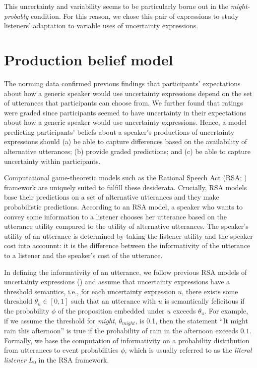 \documentclass[lucida,biblatex]{sp} %
\begin{document}
This uncertainty and variability seems to be particularly borne out in the \emph{might-probably} condition. For this reason, we chose this pair of expressions
to study listeners' adaptation to variable uses of uncertainty expressions.


\section{Production belief model}
\label{sec:model-baseline}

The norming data confirmed previous findings that participants' expectations 
about how a generic speaker would use uncertainty expressions 
depend on the set of utterances that participants can choose from.
We further found that ratings were graded since participants seemed to have uncertainty
in their expectations about how a generic speaker would use uncertainty expressions.
Hence, a model predicting participants' beliefs about a speaker's productions of uncertainty expressions
 should  (a) be able to capture differences based on the availability of alternative utterances; 
(b) provide graded predictions; 
and (c) be able to capture uncertainty within participants.

Computational game-theoretic models such as the Rational Speech Act (RSA; \cite{Goodman2016}) 
framework are uniquely suited to fulfill these desiderata.
Crucially, RSA models  base their predictions on a set of alternative utterances and 
they make probabilistic predictions.  According to an RSA model, a speaker who wants to
 convey some information to a listener 
chooses her utterance based on the utterance utility compared to the utility of alternative utterances. 
The speaker's utility of an utterance is determined by taking the listener utility and the speaker cost into accounnt: 
it is the difference between the informativity of the utterance to a listener and the speaker's cost of the utterance.

In defining the informativity of an utterance, we follow previous RSA models of uncertainty expressions (\cite{Lassiter2013,Herbstritt2019}) 
and assume that uncertainty expressions have a threshold semantics, 
i.e., for each uncertainty expression $u$, there exists some threshold $\theta_u \in [0,1]$ 
such that an utterance with $u$ is semantically felicitous if the probability $\phi$ 
of the proposition embedded under $u$ exceeds $\theta_u$. 
For example, if we assume the threshold for \textit{might}, $\theta_{might}$, is 0.1, then the statement 
``It might rain this afternoon'' is true if the probability of rain in the afternoon exceeds $0.1$. 
Formally, we base the computation of informativity on a probability distribution from utterances to event probabilities $\phi$, 
which is usually referred to as the \textit{literal listener} $L_0$ in the RSA framework. 
\end{document}
